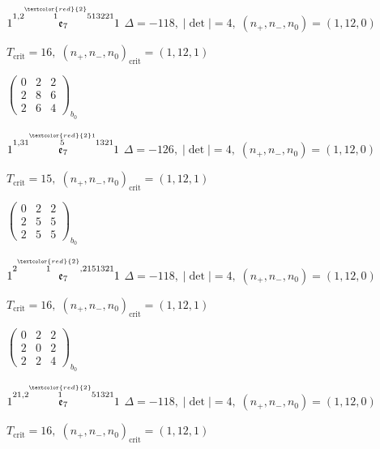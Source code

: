 \documentclass[10pt]{article}
\begin{document}
$1\overset{1,2\overset{\textcolor{red}{2}}{1}513221}{\mathfrak{e}_7}1$ \quad $\Delta=-118,\; |\det|=4,\; (n_+,n_-,n_0)=(1,12,0)$

\hspace{1em}$T_{\text{crit}}=16,\; (n_+,n_-,n_0)_{\text{crit}}=(1,12,1)$

\hspace{2em}$\left(\begin{smallmatrix}0 & 2 & 2 \\ 2 & 8 & 6 \\ 2 & 6 & 4\end{smallmatrix}\right)_{\!b_0}$

\smallskip

$1\overset{1,31\overset{\textcolor{red}{2}1}{5}1321}{\mathfrak{e}_7}1$ \quad $\Delta=-126,\; |\det|=4,\; (n_+,n_-,n_0)=(1,12,0)$

\hspace{1em}$T_{\text{crit}}=15,\; (n_+,n_-,n_0)_{\text{crit}}=(1,12,1)$

\hspace{2em}$\left(\begin{smallmatrix}0 & 2 & 2 \\ 2 & 5 & 5 \\ 2 & 5 & 5\end{smallmatrix}\right)_{\!b_0}$

\smallskip

$1\overset{2\overset{\textcolor{red}{2}}{1},2151321}{\mathfrak{e}_7}1$ \quad $\Delta=-118,\; |\det|=4,\; (n_+,n_-,n_0)=(1,12,0)$

\hspace{1em}$T_{\text{crit}}=16,\; (n_+,n_-,n_0)_{\text{crit}}=(1,12,1)$

\hspace{2em}$\left(\begin{smallmatrix}0 & 2 & 2 \\ 2 & 0 & 2 \\ 2 & 2 & 4\end{smallmatrix}\right)_{\!b_0}$

$1\overset{21,2\overset{\textcolor{red}{2}}{1}51321}{\mathfrak{e}_7}1$ \quad $\Delta=-118,\; |\det|=4,\; (n_+,n_-,n_0)=(1,12,0)$

\hspace{1em}$T_{\text{crit}}=16,\; (n_+,n_-,n_0)_{\text{crit}}=(1,12,1)$
\end{document}
